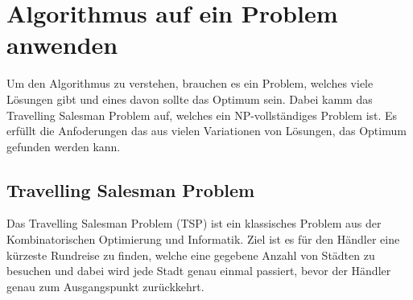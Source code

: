 %
%
%
%
\section{Algorithmus auf ein Problem anwenden}
\label{variationsprinzip_algorithmen:section:find_problem}
Um den Algorithmus zu verstehen, brauchen es ein Problem, 
welches viele Lösungen gibt und eines davon sollte das Optimum 
sein. Dabei kamm das Travelling Salesman Problem auf, welches ein
NP-vollständiges Problem ist. Es erfüllt die Anfoderungen das 
aus vielen Variationen von Lösungen, das Optimum gefunden werden 
kann.


\subsection{Travelling Salesman Problem}
\label{variationsprinzip_algorithmen:section:tsp}
Das Travelling Salesman Problem (TSP) ist ein klassisches Problem 
aus der Kombinatorischen Optimierung und Informatik. Ziel ist es 
für den Händler eine kürzeste Rundreise zu finden, welche eine 
gegebene Anzahl von Städten zu besuchen und dabei wird jede Stadt 
genau einmal passiert, bevor der Händler genau zum Ausgangspunkt 
zurückkehrt. 


